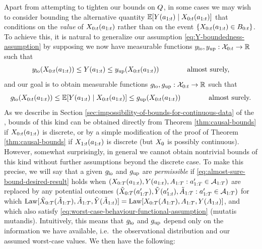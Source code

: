 Apart from attempting to tighten our bounds on $Q$, in some cases we may wish to consider bounding the alternative quantity $\mathbb{E}[Y(a_{1:t}) \mid X_{0:t}(a_{1:t})]$ that conditions on the \emph{value} of $X_{0:t}(a_{1:t})$ rather than on the event $\{X_{0:t}(a_{1:t}) \in B_{0:t}\}$.
To achieve this, it is natural to generalize our assumption \eqref{eq:Y-boundedness-assumption} by supposing we now have measurable functions $y_{\mathrm{lo}}, y_{\mathrm{up}} : \mathcal{X}_{0:t} \to \mathbb{R}$ such that
\begin{equation} \label{eq:worst-case-behaviour-functional-assumption}
    y_{\mathrm{lo}}(X_{0:t}(a_{1:t})) \leq Y(a_{1:t}) \leq y_{\mathrm{up}}(X_{0:t}(a_{1:t})) \qquad \qquad \text{almost surely,}
\end{equation}
and our goal is to obtain measurable functions $g_{\mathrm{lo}}, g_{\mathrm{up}} : \mathcal{X}_{0:t} \to \mathbb{R}$ such that
\begin{equation} \label{eq:almost-sure-bound-desired-result}
    g_{\mathrm{lo}}(X_{0:t}(a_{1:t})) \leq \mathbb{E}[Y(a_{1:t}) \mid X_{0:t}(a_{1:t})] \leq g_{\mathrm{up}}(X_{0:t}(a_{1:t})) \qquad \qquad \text{almost surely.}
\end{equation}
As we describe in Section \ref{sec:impossibility-of-bounds-for-continuous-data} of the \AppendixName, bounds of this kind can be obtained directly from Theorem \ref{thm:causal-bounds} if $X_{0:t}(a_{1:t})$ is discrete, or by a simple modification of the proof of Theorem \ref{thm:causal-bounds} if $X_{1:t}(a_{1:t})$ is discrete (but $X_0$ is possibly continuous).
However, somewhat surprisingly, in general we cannot obtain nontrivial bounds of this kind without further assumptions beyond the discrete case.
To make this precise, we will say that a given $g_{\mathrm{lo}}$ and $g_{\mathrm{up}}$ are \emph{permissible} if \eqref{eq:almost-sure-bound-desired-result} holds when $(X_{0:T}(a_{1:t}), Y(a_{1:t}), A_{1:T} : a_{1:T}' \in \mathcal{A}_{1:T})$ are replaced by any potential outcomes $(\tilde{X}_{0:T}(a_{1:T}'), \tilde{Y}(a_{1:t}'), \tilde{A}_{1:T} : a_{1:T}' \in \mathcal{A}_{1:T})$  for which $\mathrm{Law}[\tilde{X}_{0:T}(\tilde{A}_{1:T}), \tilde{A}_{1:T}, \tilde{Y}(\tilde{A}_{1:t})] = \mathrm{Law}[X_{0:T}(A_{1:T}), A_{1:T}, Y(A_{1:t})]$, and which also satisfy \eqref{eq:worst-case-behaviour-functional-assumption} (mutatis mutandis).
Intuitively, this means that $g_{\mathrm{lo}}$ and $g_{\mathrm{up}}$ depend only on the information we have available, i.e.\ the observational distribution and our assumed worst-case values.
We then have the following:

